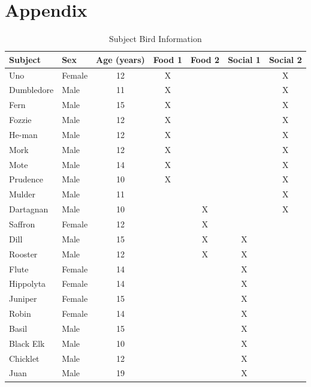 \documentclass[
  ,pub,floatsintext]{apa6}
\begin{document}
\hypertarget{appendix}{%
\section{Appendix}\label{appendix}}

\singlespacing
\renewcommand{\thetable}{A\arabic{table}}
\setcounter{table}{0}
\renewcommand{\thefigure}{A\arabic{figure}}
\setcounter{figure}{0}

\begin{table}[!h]

\caption{\label{tab:subjectinfotablelatex}Subject Bird Information}
\centering
\begin{tabular}[t]{llccccc}
\toprule
Subject & Sex & Age (years) & Food 1 & Food 2 & Social 1 & Social 2\\
\midrule
Uno & Female & 12 & X &  &  & X\\
Dumbledore & Male & 11 & X &  &  & X\\
Fern & Male & 15 & X &  &  & X\\
Fozzie & Male & 12 & X &  &  & X\\
He-man & Male & 12 & X &  &  & X\\
Mork & Male & 12 & X &  &  & X\\
Mote & Male & 14 & X &  &  & X\\
Prudence & Male & 10 & X &  &  & X\\
Mulder & Male & 11 &  &  &  & X\\
Dartagnan & Male & 10 &  & X &  & X\\
Saffron & Female & 12 &  & X &  & \\
Dill & Male & 15 &  & X & X & \\
Rooster & Male & 12 &  & X & X & \\
Flute & Female & 14 &  &  & X & \\
Hippolyta & Female & 14 &  &  & X & \\
Juniper & Female & 15 &  &  & X & \\
Robin & Female & 14 &  &  & X & \\
Basil & Male & 15 &  &  & X & \\
Black Elk & Male & 10 &  &  & X & \\
Chicklet & Male & 12 &  &  & X & \\
Juan & Male & 19 &  &  & X & \\
\bottomrule
\end{tabular}
\end{table}
\end{document}
